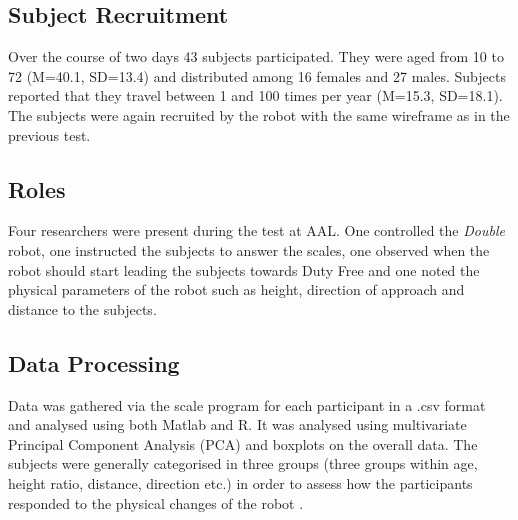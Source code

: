\subsection{Subject Recruitment}
Over the course of two days 43 subjects participated. They were aged from 10 to 72 (M=40.1, SD=13.4) and distributed among 16 females and 27 males. Subjects reported that they travel between 1 and 100 times per year (M=15.3, SD=18.1). The subjects were again recruited by the robot with the same wireframe as in the previous test.

\subsection{Roles}
Four researchers were present during the test at AAL. One controlled the \textit{Double} robot, one instructed the subjects to answer the scales, one observed when the robot should start leading the subjects towards Duty Free and one noted the physical parameters of the robot such as height, direction of approach and distance to the subjects.

\subsection{Data Processing}
Data was gathered via the scale program for each participant in a .csv format and analysed using both Matlab and R. It was analysed using multivariate Principal Component Analysis (PCA) and boxplots on the overall data. The subjects were generally categorised in three groups (three groups within age, height ratio, distance, direction etc.) in order to assess how the participants responded to the physical changes of the robot .